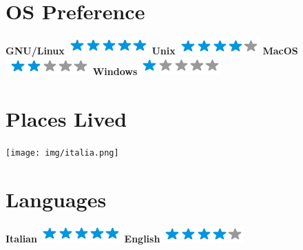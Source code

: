 \documentclass[]{friggeri-cv}
\begin{document}
\begin{aside}
	~
	~
	~
	\section{OS Preference}
	\textbf{GNU/Linux}\includegraphics[scale=0.40]{img/5stars.png}
	\textbf{Unix}\includegraphics[scale=0.40]{img/4stars.png}
	\textbf{MacOS}\includegraphics[scale=0.40]{img/2stars.png}
	\textbf{Windows}\includegraphics[scale=0.40]{img/1stars.png}
	~
	\section{Places Lived}
	\texttt{[image: img/italia.png]}
	~
	\section{Languages}
	\textbf{Italian}\includegraphics[scale=0.40]{img/5stars.png}
	\textbf{English}\includegraphics[scale=0.40]{img/4stars.png}
	~
\end{aside}
\end{document}
